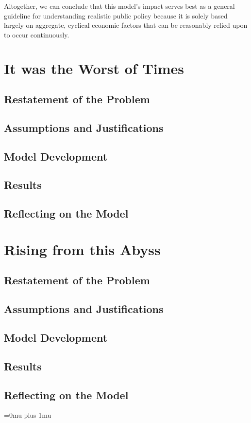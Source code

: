 \documentclass[12pt]{article}
\begin{document}
\noindent
Altogether, we can conclude that this model's impact serves best as a general guideline for understanding realistic public policy because it is solely based largely on aggregate, cyclical economic factors that can be reasonably relied upon to occur continuously.

\newpage

\section{It was the Worst of Times}

\subsection{Restatement of the Problem}
\subsection{Assumptions and Justifications}
\subsection{Model Development}
\subsection{Results}
\subsection{Reflecting on the Model}

\newpage

\section{Rising from this Abyss}

\subsection{Restatement of the Problem}
\subsection{Assumptions and Justifications}
\subsection{Model Development}
\subsection{Results}
\subsection{Reflecting on the Model}

\newpage

\Urlmuskip=0mu plus 1mu\relax


\end{document}
